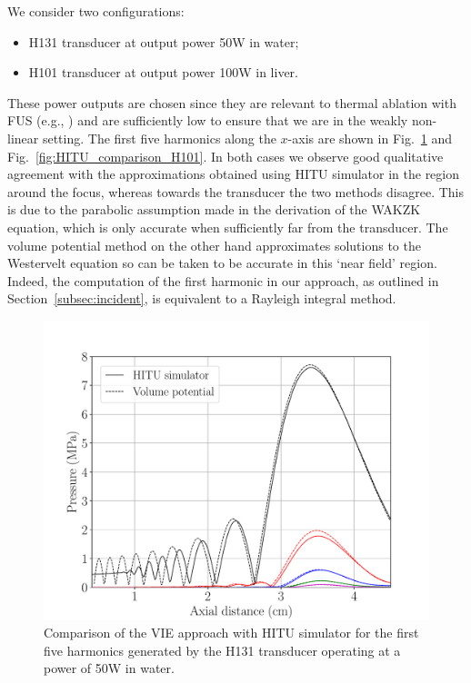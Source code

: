 \documentclass[11pt]{article}
\numberwithin{equation}{section}
\newcommand{\red}[1]{{\color{black} #1}}
\begin{document}
We consider two configurations: 
\begin{itemize}
    \item H131 transducer at output power 50W in water;
    \item H101 transducer at output power 100W in liver.
\end{itemize}
\red{These power outputs are chosen since they are relevant to thermal ablation with FUS 
(e.g., \cite{kothapalli2018convenient,ries2010real}) and are sufficiently low to ensure 
that we are in the weakly non-linear setting.}
The first five harmonics along the $x$-axis are shown in 
Fig.~\ref{fig:HITU_comparison_H131} and Fig.~\ref{fig:HITU_comparison_H101}.
In both cases we observe good qualitative agreement with the approximations 
obtained using HITU simulator in the region around the focus, whereas towards the transducer 
the two methods disagree. This is due to the parabolic assumption 
made in the derivation of the WAKZK equation, which is only accurate when 
sufficiently far from the transducer. The volume potential method on the other hand 
approximates solutions to the Westervelt equation so can be taken to be accurate 
in this `near field' region. Indeed, the computation of the first harmonic in 
our approach, as outlined in Section~\ref{subsec:incident}, is equivalent to a Rayleigh 
integral method.
\begin{figure}[h!]
    \centering
    \includegraphics[width=\linewidth]{Figure5.pdf}
    \caption{Comparison of the VIE approach with HITU simulator for the first 
    five harmonics generated by the H131 transducer operating at a power of 50W in water.}
    \label{fig:HITU_comparison_H131}
\end{figure}
\end{document}
